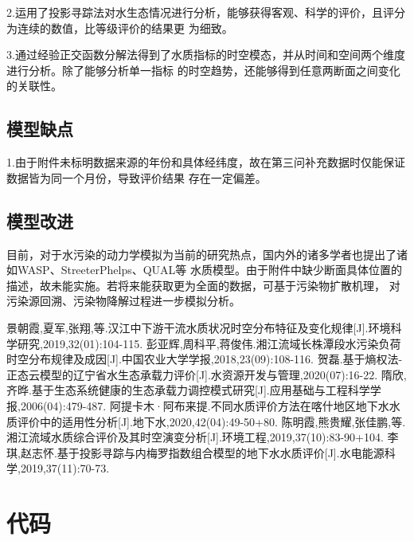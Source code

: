 \documentclass{whutmod}
\begin{document}
\begin{spacing}{1.2}
2.运用了投影寻踪法对水生态情况进行分析，能够获得客观、科学的评价，且评分为连续的数值，比等级评价的结果更
为细致。

3.通过经验正交函数分解法得到了水质指标的时空模态，并从时间和空间两个维度进行分析。除了能够分析单一指标
的时空趋势，还能够得到任意两断面之间变化的关联性。

\subsection{模型缺点}
1.由于附件未标明数据来源的年份和具体经纬度，故在第三问补充数据时仅能保证数据皆为同一个月份，导致评价结果
存在一定偏差。

\subsection{模型改进}
目前，对于水污染的动力学模拟为当前的研究热点，国内外的诸多学者也提出了诸如WASP、StreeterPhelps、QUAL等
水质模型。由于附件中缺少断面具体位置的描述，故未能实施。若将来能获取更为全面的数据，可基于污染物扩散机理，
对污染源回溯、污染物降解过程进一步模拟分析。

\clearpage




\begin{thebibliography}{9}%
		 景朝霞,夏军,张翔,等.汉江中下游干流水质状况时空分布特征及变化规律[J].环境科学研究,2019,32(01):104-115.
		 彭亚辉,周科平,蒋俊伟.湘江流域长株潭段水污染负荷时空分布规律及成因[J].中国农业大学学报,2018,23(09):108-116.
		贺磊.基于熵权法-正态云模型的辽宁省水生态承载力评价[J].水资源开发与管理,2020(07):16-22.
		 隋欣,齐晔.基于生态系统健康的生态承载力调控模式研究[J].应用基础与工程科学学报,2006(04):479-487.
		阿提卡木·阿布来提.不同水质评价方法在喀什地区地下水水质评价中的适用性分析[J].地下水,2020,42(04):49-50+80.
		陈明霞,熊贵耀,张佳鹏,等.湘江流域水质综合评价及其时空演变分析[J].环境工程,2019,37(10):83-90+104.
		李琪,赵志怀.基于投影寻踪与内梅罗指数组合模型的地下水水质评价[J].水电能源科学,2019,37(11):70-73.

\end{thebibliography}

	\clearpage

	\appendix %



\section{代码}

\end{spacing}
\end{document}
